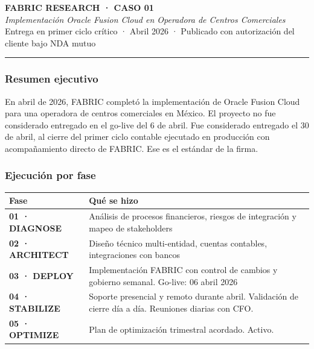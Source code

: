 \documentclass[11pt, a4paper]{article}
\begin{document}
\begin{center}
{\large\bfseries FABRIC RESEARCH · CASO 01}\\[0.4em]
\textit{Implementación Oracle Fusion Cloud en Operadora de Centros Comerciales}\\[0.2em]
{\small Entrega en primer ciclo crítico · Abril 2026 · Publicado con autorización
del cliente bajo NDA mutuo}
\end{center}

\vspace{1em}
\hrule
\vspace{1em}

\subsubsection*{Resumen ejecutivo}

En abril de 2026, FABRIC completó la implementación de Oracle Fusion Cloud para
una operadora de centros comerciales en México. El proyecto no fue considerado
entregado en el go-live del 6 de abril. Fue considerado entregado el 30 de abril,
al cierre del primer ciclo contable ejecutado en producción con acompañamiento
directo de FABRIC. Ese es el estándar de la firma.

\subsubsection*{Ejecución por fase}

\begin{table}[h]
\centering
\begin{tabularx}{\linewidth}{>{\ttfamily\color{accent}\bfseries}l X}
\toprule
Fase & Qué se hizo \\
\midrule
01 · DIAGNOSE   & Análisis de procesos financieros, riesgos de integración y mapeo de stakeholders \\
02 · ARCHITECT  & Diseño técnico multi-entidad, cuentas contables, integraciones con bancos \\
03 · DEPLOY     & Implementación FABRIC con control de cambios y gobierno semanal. Go-live: 06 abril 2026 \\
04 · STABILIZE  & Soporte presencial y remoto durante abril. Validación de cierre día a día. Reuniones diarias con CFO. \\
05 · OPTIMIZE   & Plan de optimización trimestral acordado. Activo. \\
\bottomrule
\end{tabularx}
\end{table}
\end{document}
